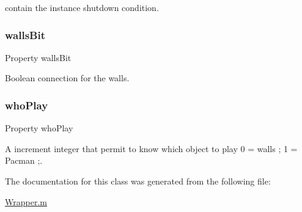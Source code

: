 contain the instance shutdown condition. 

\mbox{\label{class_wrapper_a94dd71be012b98d496117309a20939b1}} 
\subsubsection{\texorpdfstring{walls\+Bit}{wallsBit}}
{\footnotesize\ttfamily Property walls\+Bit}



Boolean connection for the walls. 

\mbox{\label{class_wrapper_a19e8c1d68257003eba8e5a47c8302113}} 
\subsubsection{\texorpdfstring{who\+Play}{whoPlay}}
{\footnotesize\ttfamily Property who\+Play}



A increment integer that permit to know which object to play 0 = walls ; 1 = Pacman ;. 



The documentation for this class was generated from the following file\+:\begin{DoxyCompactItemize}
\item 
\hyperlink{_wrapper_8m}{Wrapper.\+m}\end{DoxyCompactItemize}
